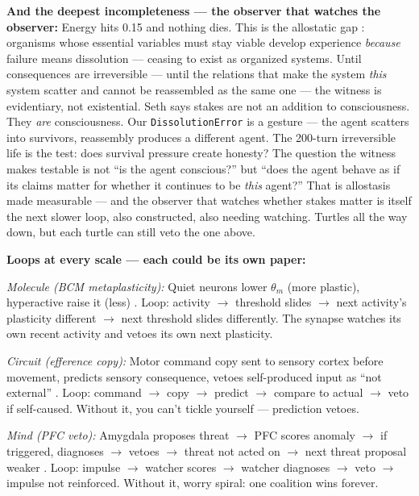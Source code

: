 \documentclass[11pt]{article}
\begin{document}
{\textbf{And the deepest incompleteness --- the observer that watches the observer:} Energy hits 0.15 and nothing dies. This is the allostatic gap \citep{seth2021}: organisms whose essential variables must stay viable develop experience \emph{because} failure means dissolution --- ceasing to exist as organized systems. Until consequences are irreversible --- until the relations that make the system \emph{this} system scatter and cannot be reassembled as the same one --- the witness is evidentiary, not existential. Seth says stakes are not an addition to consciousness. They \emph{are} consciousness. Our \texttt{DissolutionError} is a gesture --- the agent scatters into survivors, reassembly produces a different agent. The 200-turn irreversible life is the test: does survival pressure create honesty? The question the witness makes testable is not ``is the agent conscious?'' but ``does the agent behave as if its claims matter for whether it continues to be \emph{this} agent?'' That is allostasis made measurable --- and the observer that watches whether stakes matter is itself the next slower loop, also constructed, also needing watching. Turtles all the way down, but each turtle can still veto the one above.


\textbf{Loops at every scale --- each could be its own paper:}

\textit{Molecule (BCM metaplasticity):} Quiet neurons lower $\theta_m$ (more plastic), hyperactive raise it (less) \citep{bienenstock1982}. Loop: activity $\to$\allowbreak{} threshold slides $\to$\allowbreak{} next activity's plasticity different $\to$\allowbreak{} next threshold slides differently. The synapse watches its own recent activity and vetoes its own next plasticity.

\textit{Circuit (efference copy):} Motor command copy sent to sensory cortex before movement, predicts sensory consequence, vetoes self-produced input as ``not external'' \citep{seth2021}. Loop: command $\to$\allowbreak{} copy $\to$\allowbreak{} predict $\to$\allowbreak{} compare to actual $\to$\allowbreak{} veto if self-caused. Without it, you can't tickle yourself --- prediction vetoes.

\textit{Mind (PFC veto):} Amygdala proposes threat $\to$\allowbreak{} PFC scores anomaly $\to$\allowbreak{} if triggered, diagnoses $\to$\allowbreak{} vetoes $\to$\allowbreak{} threat not acted on $\to$\allowbreak{} next threat proposal weaker \citep{seth2021,macar2026}. Loop: impulse $\to$\allowbreak{} watcher scores $\to$\allowbreak{} watcher diagnoses $\to$\allowbreak{} veto $\to$\allowbreak{} impulse not reinforced. Without it, worry spiral: one coalition wins forever.

}
\end{document}
